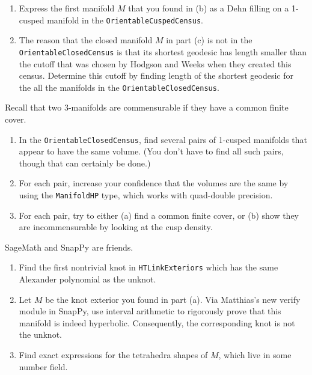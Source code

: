\documentclass[tikz, a4paper]{nmd/hw}
\begin{document}
\begin{problems}
\begin{enumerate}
      \item Express the first manifold $M$ that you found in (b) as a
        Dehn filling on a 1-cusped manifold in the
        \texttt{OrientableCuspedCensus}.  

      \item The reason that the closed manifold $M$ in part (c) is not
        in the \texttt{OrientableClosedCensus} is that its shortest
        geodesic has length smaller than the cutoff that was chosen by
        Hodgson and Weeks when they created this census.  Determine
        this cutoff by finding length of the shortest geodesic for the
        all the manifolds in the \texttt{OrientableClosedCensus}.
    \end{enumerate}

\item Recall that two 3-manifolds are commensurable if they have a
  common finite cover.  
  \begin{enumerate}
  \item In the \texttt{OrientableClosedCensus}, find several pairs of
    1-cusped manifolds that appear to have the same volume. (You don't
    have to find all such pairs, though that can certainly be done.)

  \item For each pair, increase your confidence that the volumes are
    the same by using the \texttt{ManifoldHP} type, which works with
    quad-double precision.

    \item For each pair, try to either (a) find a common finite cover,
      or (b) show they are incommensurable by looking at the cusp
      density.  
  \end{enumerate}

\item SageMath and SnapPy are friends.
  \begin{enumerate}
  \item Find the first nontrivial knot in \texttt{HTLinkExteriors}
    which has the same Alexander polynomial as the unknot.

  \item Let $M$ be the knot exterior you found in part (a).  Via
    Matthias's new verify module in SnapPy, use interval arithmetic to
    rigorously prove that this manifold is indeed hyperbolic.
    Consequently, the corresponding knot is not the unknot. 

  \item Find exact expressions for the tetrahedra shapes of
    $M$, which live in some number field.  


\end{enumerate}
\end{problems}
\end{document}
